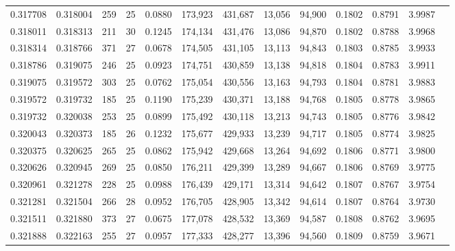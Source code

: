 \begin{tabular}{rrrrrrrrrrrrr}
0.317708 & 0.318004 &   259 &  25 &                                     0.0880 & 173,923 & 431,687 &  13,056 &  94,900 & 0.1802 & 0.8791 & 3.9987 \\
0.318011 & 0.318313 &   211 &  30 &                                     0.1245 & 174,134 & 431,476 &  13,086 &  94,870 & 0.1802 & 0.8788 & 3.9968 \\
0.318314 & 0.318766 &   371 &  27 &                                     0.0678 & 174,505 & 431,105 &  13,113 &  94,843 & 0.1803 & 0.8785 & 3.9933 \\
0.318786 & 0.319075 &   246 &  25 &                                     0.0923 & 174,751 & 430,859 &  13,138 &  94,818 & 0.1804 & 0.8783 & 3.9911 \\
0.319075 & 0.319572 &   303 &  25 &                                     0.0762 & 175,054 & 430,556 &  13,163 &  94,793 & 0.1804 & 0.8781 & 3.9883 \\
0.319572 & 0.319732 &   185 &  25 &                                     0.1190 & 175,239 & 430,371 &  13,188 &  94,768 & 0.1805 & 0.8778 & 3.9865 \\
0.319732 & 0.320038 &   253 &  25 &                                     0.0899 & 175,492 & 430,118 &  13,213 &  94,743 & 0.1805 & 0.8776 & 3.9842 \\
0.320043 & 0.320373 &   185 &  26 &                                     0.1232 & 175,677 & 429,933 &  13,239 &  94,717 & 0.1805 & 0.8774 & 3.9825 \\
0.320375 & 0.320625 &   265 &  25 &                                     0.0862 & 175,942 & 429,668 &  13,264 &  94,692 & 0.1806 & 0.8771 & 3.9800 \\
0.320626 & 0.320945 &   269 &  25 &                                     0.0850 & 176,211 & 429,399 &  13,289 &  94,667 & 0.1806 & 0.8769 & 3.9775 \\
0.320961 & 0.321278 &   228 &  25 &                                     0.0988 & 176,439 & 429,171 &  13,314 &  94,642 & 0.1807 & 0.8767 & 3.9754 \\
0.321281 & 0.321504 &   266 &  28 &                                     0.0952 & 176,705 & 428,905 &  13,342 &  94,614 & 0.1807 & 0.8764 & 3.9730 \\
0.321511 & 0.321880 &   373 &  27 &                                     0.0675 & 177,078 & 428,532 &  13,369 &  94,587 & 0.1808 & 0.8762 & 3.9695 \\
0.321888 & 0.322163 &   255 &  27 &                                     0.0957 & 177,333 & 428,277 &  13,396 &  94,560 & 0.1809 & 0.8759 & 3.9671 \\

\end{tabular}
